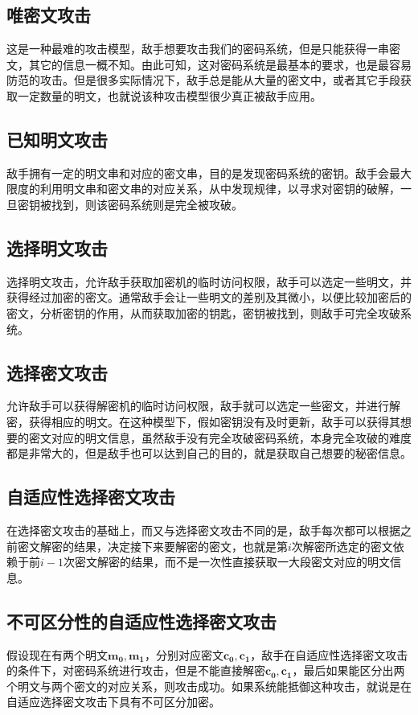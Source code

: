 \subsection{唯密文攻击}
这是一种最难的攻击模型，敌手想要攻击我们的密码系统，但是只能获得一串密文，其它的信息一概不知。由此可知，这对密码系统是最基本的要求，也是最容易防范的攻击。但是很多实际情况下，敌手总是能从大量的密文中，或者其它手段获取一定数量的明文，也就说该种攻击模型很少真正被敌手应用。

\subsection{已知明文攻击}
敌手拥有一定的明文串和对应的密文串，目的是发现密码系统的密钥。敌手会最大限度的利用明文串和密文串的对应关系，从中发现规律，以寻求对密钥的破解，一旦密钥被找到，则该密码系统则是完全被攻破。

\subsection{选择明文攻击}
选择明文攻击，允许敌手获取加密机的临时访问权限，敌手可以选定一些明文，并获得经过加密的密文。通常敌手会让一些明文的差别及其微小，以便比较加密后的密文，分析密钥的作用，从而获取加密的钥匙，密钥被找到，则敌手可完全攻破系统。

\subsection{选择密文攻击}
允许敌手可以获得解密机的临时访问权限，敌手就可以选定一些密文，并进行解密，获得相应的明文。在这种模型下，假如密钥没有及时更新，敌手可以获得其想要的密文对应的明文信息，虽然敌手没有完全攻破密码系统，本身完全攻破的难度都是非常大的，但是敌手也可以达到自己的目的，就是获取自己想要的秘密信息。

\subsection{自适应性选择密文攻击}
在选择密文攻击的基础上，而又与选择密文攻击不同的是，敌手每次都可以根据之前密文解密的结果，决定接下来要解密的密文，也就是第$i$次解密所选定的密文依赖于前$i - 1$次密文解密的结果，而不是一次性直接获取一大段密文对应的明文信息。

\subsection{不可区分性的自适应性选择密文攻击}
假设现在有两个明文$\mathbf{m_0},\mathbf{m_1}$，分别对应密文$\mathbf{c_0},\mathbf{c_1}$，敌手在自适应性选择密文攻击的条件下，对密码系统进行攻击，但是不能直接解密$\mathbf{c_0},\mathbf{c_1}$，最后如果能区分出两个明文与两个密文的对应关系，则攻击成功。如果系统能抵御这种攻击，就说是在自适应选择密文攻击下具有不可区分加密。

